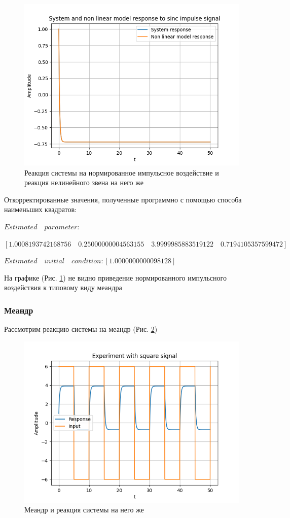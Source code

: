 \begin{figure}[H]
	\centering
	\includegraphics[width=0.9\linewidth]{body/images/System-and-non-linear-model-response-to-sinc-impulse-signal.png}
	\caption{Реакция системы на нормированное импульсное воздействие и реакция нелинейного звена на него же}
	\label{fig:10}
\end{figure}

Откорректированные значения, полученные программно с помощью способа наименьших квадратов:

$Estimated\quad parameter:$

\qquad$[1.0008193742168756\quad 0.25000000004563155\quad 3.9999985883519122\quad 0.7194105357599472]$

$Estimated\quad initial\quad condition: [1.0000000000098128]$

На графике (Рис. \ref{fig:10}) не видно приведение нормированного импульсного воздействия к типовому виду меандра

\subsubsection{Меандр}
Рассмотрим реакцию системы на меандр (Рис. \ref{fig:11})

\begin{figure}[H]
	\centering
	\includegraphics[width=0.7\linewidth]{body/images/Experiment-with-square-signal.png}
	\caption{Меандр и реакция системы на него же}
	\label{fig:11}
\end{figure}

